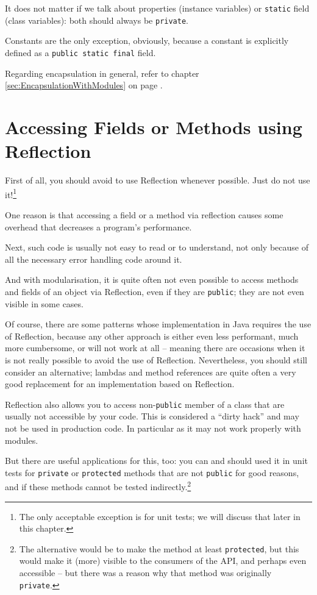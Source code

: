 \documentclass[11pt,a4paper, titlepage, parskip=half, headsepline, footsepline, cleardoublepage=current, headheight=1cm]{scrbook}
\newcommand*{\tqvref}[1]{\hyperref[{#1}]{\ref*{#1}} on page \pageref{#1}}
\begin{document}
It does not matter if we talk about properties (instance variables) or \lstinline|static| field (class variables): both should always be \lstinline|private|.

Constants are the only exception, obviously, because a constant is explicitly defined as a \lstinline|public static final| field.

Regarding encapsulation in general, refer to chapter \tqvref{sec:EncapsulationWithModules}.

\section{Accessing Fields or Methods using Reflection}
First of all, you should avoid to use Reflection whenever possible. Just do not use it!\footnote{The only acceptable exception is for unit tests; we will discuss that later in this chapter.}

One reason is that accessing a field or a method via reflection causes some overhead that decreases a program’s performance. 

Next, such code is usually not easy to read or to understand, not only because of all the necessary error handling code around it.

And with modularisation, it is quite often not even possible to access methods and fields of an object via Reflection, even if they are \lstinline|public|; they are not even visible in some cases.

Of course, there are some patterns whose implementation in Java requires the use of Reflection, because any other approach is either even less performant, much more cumbersome, or will not work at all – meaning there are occasions when it is not really possible to avoid the use of Reflection. Nevertheless, you should still consider an alternative; lambdas\autocite{ORACLE_DOC_LANGUAGE_SPECIFICATION:LambdaExpressions} and method references\autocite{ORACLE_DOC_LANGUAGE_SPECIFICATION:MethodReference} are quite often a very good replacement for an implementation based on Reflection.

Reflection also allows you to access non-\lstinline|public| member of a class that are usually not accessible by your code. This is considered a “dirty hack” and may not be used in production code. In particular as it may not work properly with modules.

But there are useful applications for this, too: you can and should used it in unit tests for \lstinline|private| or \lstinline|protected| methods that are not \lstinline|public| for good reasons, and if these methods cannot be tested indirectly.\footnote{The alternative would be to make the method at least \lstinline|protected|, but this would make it (more) visible to the consumers of the API, and perhaps even accessible – but there was a reason why that method was originally \lstinline|private|.}
\end{document}
